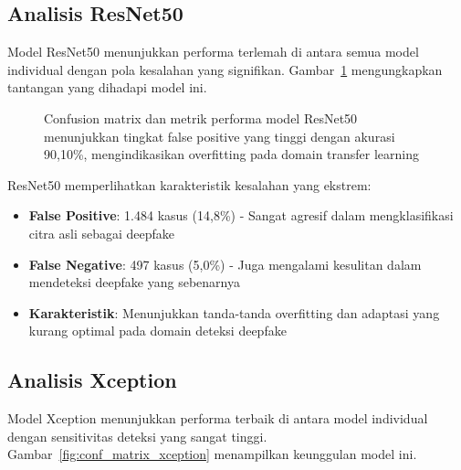 \subsection{Analisis ResNet50}

Model ResNet50 menunjukkan performa terlemah di antara semua model individual dengan pola kesalahan yang signifikan. Gambar~\ref{fig:conf_matrix_resnet50} mengungkapkan tantangan yang dihadapi model ini.

\begin{figure}[H]
    \centering
    \caption{Confusion matrix dan metrik performa model ResNet50 menunjukkan tingkat false positive yang tinggi dengan akurasi 90,10\%, mengindikasikan overfitting pada domain transfer learning}
    \label{fig:conf_matrix_resnet50}
\end{figure}

ResNet50 memperlihatkan karakteristik kesalahan yang ekstrem:
\begin{itemize}
    \item \textbf{False Positive}: 1.484 kasus (14,8\%) - Sangat agresif dalam mengklasifikasi citra asli sebagai deepfake
    \item \textbf{False Negative}: 497 kasus (5,0\%) - Juga mengalami kesulitan dalam mendeteksi deepfake yang sebenarnya
    \item \textbf{Karakteristik}: Menunjukkan tanda-tanda overfitting dan adaptasi yang kurang optimal pada domain deteksi deepfake
\end{itemize}

\subsection{Analisis Xception}

Model Xception menunjukkan performa terbaik di antara model individual dengan sensitivitas deteksi yang sangat tinggi. Gambar~\ref{fig:conf_matrix_xception} menampilkan keunggulan model ini.

